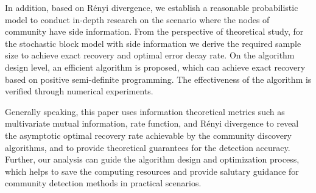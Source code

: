 \begin{abstract*}
  In addition, based on Rényi divergence,
  we establish a reasonable probabilistic model
  to conduct in-depth research on the scenario
  where the nodes of community have side information.
  From the perspective of theoretical study,
  for the stochastic block model with side information
  we derive the required sample size to achieve exact recovery and optimal error decay rate.
  On the algorithm design level,
  an efficient algorithm is proposed, which can achieve exact recovery based on positive semi-definite programming.
  The effectiveness of the algorithm is verified through numerical experiments.

  Generally speaking, this paper uses information theoretical metrics
  such as multivariate mutual information,
  rate function, and Rényi divergence to reveal the asymptotic
  optimal recovery rate achievable by the community discovery algorithms,
  and to provide theoretical guarantees for the detection accuracy.
  Further, our analysis can guide the algorithm design and optimization process,
  which helps to save the computing resources and provide salutary guidance
  for community detection methods in practical scenarios.
\end{abstract*}
